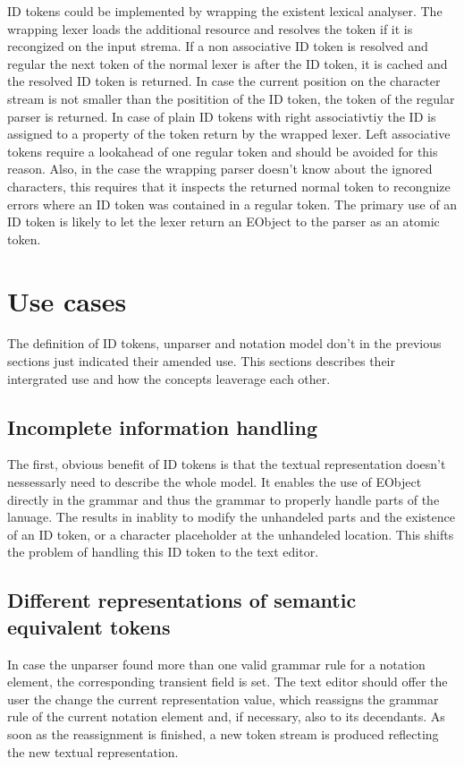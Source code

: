 ID tokens could be implemented by wrapping the existent lexical analyser. The wrapping lexer loads the additional resource and resolves the token if it is recongized on the input strema. If a non associative ID token is resolved and regular the next token of the normal lexer is after the ID token, it is cached and the resolved ID token is returned. In case the current position on the character stream is not smaller than the positition of the ID token, the token of the regular parser is returned. In case of plain ID tokens with right associativtiy the ID is assigned to a property of the token return by the wrapped lexer. Left associative tokens require a lookahead of one regular token and should be avoided for this reason. Also, in the case the wrapping parser doesn't know about the ignored characters, this requires that it inspects the returned normal token to recongnize errors where an ID token was contained in a regular token. The primary use of an ID token is likely to let the lexer return an EObject to the parser as an atomic token.


\section{Use cases}
The definition of ID tokens, unparser and notation model don't in the previous sections just indicated their amended use. This sections describes their intergrated use and how the concepts leaverage each other. 

\subsection{Incomplete information handling}
The first, obvious benefit of ID tokens is that the textual representation doesn't nessessarly need to describe the whole model. It enables the use of EObject directly in the grammar and thus the grammar to properly handle parts of the lanuage. The results in inablity to modify the unhandeled parts and the existence of an ID token, or a character placeholder at the unhandeled location. This shifts the problem of handling this ID token to the text editor.

\subsection{Different representations of semantic equivalent tokens}
In case the unparser found more than one valid grammar rule for a notation element, the corresponding transient field is set. The text editor should offer the user the change the current representation value, which reassigns the grammar rule of the current notation element and, if necessary, also to its decendants. As soon as the reassignment is finished, a new token stream is produced reflecting the new textual representation.


